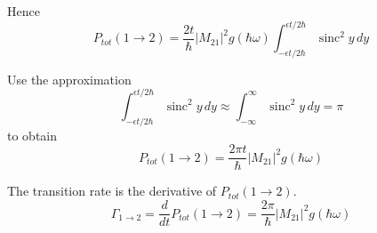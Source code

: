 Hence
\begin{equation*}
P_{tot}(1\rightarrow2)=\frac{2t}{\hbar}|M_{21}|^2g(\hbar\omega)
\int_{-\epsilon t/2\hbar}^{\epsilon t/2\hbar}
\operatorname{sinc}^2y\,dy
\end{equation*}

Use the approximation
\begin{equation*}
\int_{-\epsilon t/2\hbar}^{\epsilon t/2\hbar}\operatorname{sinc}^2 y\,dy
\approx
\int_{-\infty}^\infty\operatorname{sinc}^2 y\,dy=\pi
\end{equation*}
%
to obtain
\begin{equation*}
P_{tot}(1\rightarrow2)=\frac{2\pi t}{\hbar}|M_{21}|^2g(\hbar\omega)
\end{equation*}

The transition rate is the derivative of $P_{tot}(1\rightarrow2)$.
\begin{equation*}
\Gamma_{1\rightarrow2}
=\frac{d}{dt}P_{tot}(1\rightarrow2)=\frac{2\pi}{\hbar}|M_{21}|^2g(\hbar\omega)
\end{equation*}


